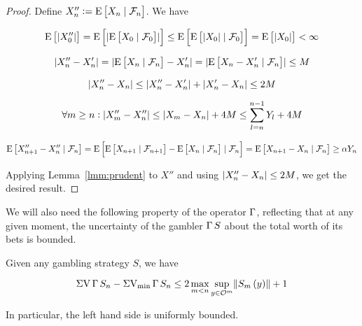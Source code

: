 \begin{proof}

Define ${X''_n:= \operatorname{E}\left[X_n \mid \mathcal{F}_n\right]}$. We have

$$\operatorname{E}\left[\lvert X''_0 \rvert\right] = \operatorname{E}\left[\lvert \operatorname{E}\left[X_0 \mid \mathcal{F}_0\right] \rvert\right] \leq \operatorname{E}\left[\operatorname{E}\left[\lvert X_0 \rvert \mid \mathcal{F}_0\right]\right] = \operatorname{E}\left[\lvert X_0 \rvert\right] < \infty$$

$$\lvert X''_n - X'_n \rvert = \lvert \operatorname{E}\left[X_n \mid \mathcal{F}_n\right] - X'_n \rvert = \lvert \operatorname{E}\left[X_n - X'_n \mid \mathcal{F}_n\right] \rvert \leq M$$

$$\lvert X''_n - X_n \rvert \leq \lvert X''_n - X'_n \rvert + \lvert X'_n - X_n \rvert \leq 2M$$

$$\forall m \geq n: \lvert X''_{m}-X''_n \rvert \leq \lvert X_{m}-X_n \rvert + 4M \leq \sum_{l=n}^{n-1} Y_l + 4M$$

$$\operatorname{E}\left[X''_{n+1}-X''_n \mid \mathcal{F}_n\right] = \operatorname{E}\left[\operatorname{E}\left[X_{n+1} \mid \mathcal{F}_{n+1}\right]-\operatorname{E}\left[X_n \mid \mathcal{F}_n\right] \mid \mathcal{F}_n\right] = \operatorname{E}\left[X_{n+1}-X_n \mid \mathcal{F}_n\right] \geq \alpha Y_n$$

Applying Lemma~\ref{lmm:prudent} to $X''$ and using ${\lvert X''_n - X_n \rvert \leq 2M}$, we get the desired result.
\end{proof}

We will also need the following property of the operator $\operatorname{\Gamma}$, reflecting that at any given moment, the uncertainty of the gambler $\operatorname{\Gamma}{S}$ about the total worth of its bets is bounded.

\begin{samepage}
\begin{proposition}
\label{prp:pg_bounded_uncertainty}

Given any gambling strategy $S$, we have

\begin{equation}
\operatorname{\Sigma V} \operatorname{\Gamma}{S}_n - \operatorname{\Sigma V_{\min}} \operatorname{\Gamma}{S}_n \leq 2 \max_{m < n} \sup_{y \in \mathcal{O}^m} \lVert S_m\left(y\right) \rVert + 1
\end{equation}

In particular, the left hand side is uniformly bounded.

\end{proposition}
\end{samepage}

